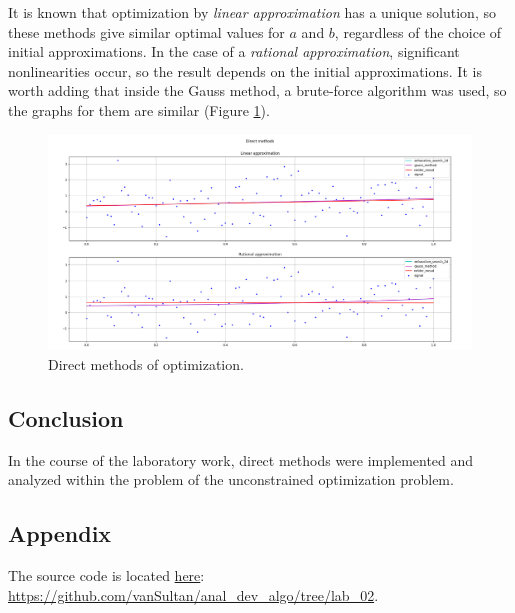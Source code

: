 It is known that optimization by \textit{linear approximation} has a unique solution, so these methods give similar optimal values for $a$ and $b$, regardless of the choice of initial approximations.
In the case of a \textit{rational approximation}, significant nonlinearities occur, so the result depends on the initial approximations. It is worth adding that inside the Gauss method, a brute-force algorithm was used, so the graphs for them are similar (Figure \ref{ris:direct}).

\begin{figure}[H]
    \center
    \includegraphics[width=\textwidth]{img/plot.png}
    \caption{Direct methods of optimization.}
    \label{ris:direct}
\end{figure}

\subsection{Conclusion}

In the course of the laboratory work, direct methods were implemented and analyzed within the problem of the unconstrained optimization problem.

\subsection{Appendix}

The source code is located \href{https://github.com/vanSultan/anal_dev_algo/tree/lab_02}{here}: \url{https://github.com/vanSultan/anal_dev_algo/tree/lab_02}.

